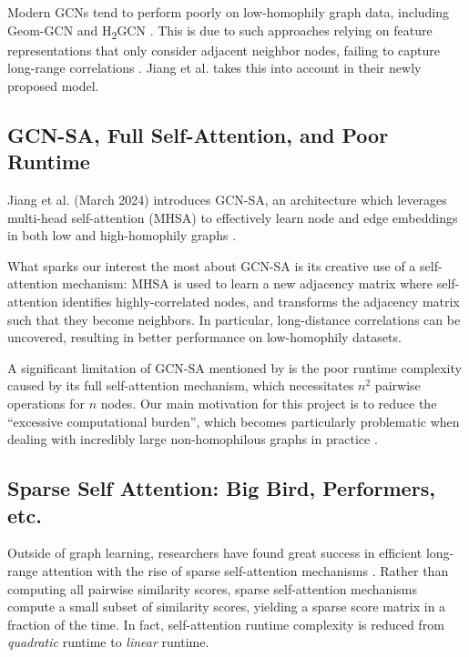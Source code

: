 \documentclass{article}
\begin{document}
Modern GCNs tend to perform poorly on low-homophily graph data,
including Geom-GCN \cite{pei2020geom}
and H\textsubscript{2}GCN \cite{zhu2020beyond}.
This is due to such approaches relying on
feature representations that only consider
adjacent neighbor nodes,
failing to capture long-range correlations \cite{jiang2024self}.
Jiang et al. takes this into account in their
newly proposed model. 

\subsection{GCN-SA, Full Self-Attention, and Poor Runtime}

Jiang et al. (March 2024) introduces GCN-SA,
an architecture which leverages multi-head self-attention
(MHSA) to effectively learn node and edge embeddings
in both low and high-homophily graphs \cite{jiang2024self}.

What sparks our interest the most about GCN-SA
is its creative use of a self-attention mechanism:
MHSA is used to learn a new adjacency matrix
where self-attention identifies highly-correlated nodes,
and transforms the adjacency matrix such that they become neighbors.
In particular, long-distance correlations can be uncovered,
resulting in better performance on low-homophily datasets.

A significant limitation of GCN-SA mentioned by \cite{jiang2024self} 
is the poor runtime complexity
caused by its full self-attention mechanism,
which necessitates $ n^2 $ pairwise operations
for $ n $ nodes.
Our main motivation for this project is to reduce the
``excessive computational burden'', which becomes particularly
problematic when dealing with incredibly large non-homophilous graphs 
in practice \cite{lim2021large}.

\subsection{Sparse Self Attention: Big Bird, Performers, etc.}

Outside of graph learning,
researchers have found great success in
efficient long-range attention
with the rise of sparse self-attention mechanisms
\cite{
  zaheer2020big, 
  choromanski2020rethinking, 
  beltagy2020longformer}.
Rather than computing all pairwise similarity scores,
sparse self-attention mechanisms
compute a small subset of similarity scores,
yielding a sparse score matrix in a fraction of the time.
In fact, self-attention runtime complexity is reduced from 
\textit{quadratic} runtime to \textit{linear} runtime.
\end{document}
